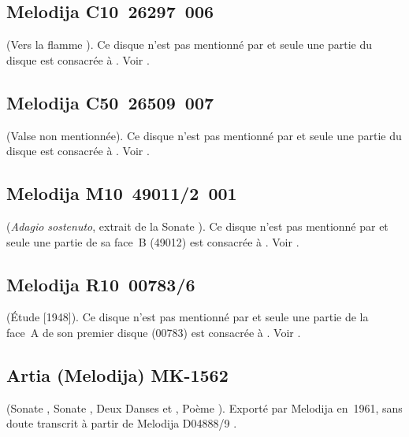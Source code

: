 \subsection{Melodija C10~26297~006}

\Scriabine{} (Vers la flamme ).
Ce disque n'est pas mentionné par \INikonovich{}
\citep[voir][]{Nikonovich11} et seule une partie du disque est consacrée à
\VSofronitsky{}.
Voir \citet{Recordssu}.

\subsection{Melodija C50~26509~007}

\Chopin{} (Valse non mentionnée).
Ce disque n'est pas mentionné par \INikonovich{}
\citep[voir][]{Nikonovich11} et seule une partie du disque est consacrée à
\VSofronitsky{}.
Voir \citet{Recordssu}.

\subsection{Melodija M10~49011/2~001}

\Beethoven{} (\emph{Adagio sostenuto}, extrait de la Sonate 
).
Ce disque n'est pas mentionné par \INikonovich{}
\citep[voir][]{Nikonovich11} et seule une partie de sa face~B (49012) est
consacrée à \VSofronitsky{}.
Voir \citet{Recordssu}.

\subsection{Melodija R10~00783/6}

\Scriabine{} (Étude   [1948]).
Ce disque n'est pas mentionné par \INikonovich{}
\citep[voir][]{Nikonovich11} et seule une partie de la face~A de son premier
disque (00783) est consacrée à \VSofronitsky{}.
Voir \citet{Recordssu}.

\subsection{Artia (Melodija) MK-1562}

\Scriabine{} (Sonate , Sonate , Deux Danses 
 et  , Poème ).
Exporté par Melodija en~1961, sans doute transcrit à partir de Melodija
D04888/9 \citep[voir][p.~94]{White}.

